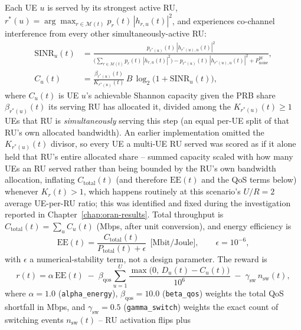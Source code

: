 Each UE $u$ is served by its strongest active RU,
$r^*(u) = \arg\max_{r \in \mathcal{M}(t)} p_r(t)\,|h_{r,u}(t)|^2$, and
experiences co-channel interference from every other simultaneously-active
RU:
\begin{align}
  \mathrm{SINR}_u(t) &= \frac{p_{r^*(u)}(t)\,|h_{r^*(u),u}(t)|^2}{\Big(\sum_{r \in \mathcal{M}(t)} p_r(t)\,|h_{r,u}(t)|^2\Big) - p_{r^*(u)}(t)\,|h_{r^*(u),u}(t)|^2 + P_{\mathrm{noise}}^{\mathrm{W}}}, \label{eq:oran-sinr}\\
  C_u(t) &= \frac{\beta_{r^*(u)}(t)}{K_{r^*(u)}(t)}\, B\, \log_2\!\big(1 + \mathrm{SINR}_u(t)\big), \label{eq:oran-capacity}
\end{align}
where $C_u(t)$ is UE $u$'s achievable Shannon capacity given the PRB share
$\beta_{r^*(u)}(t)$ its serving RU has allocated it, divided among the
$K_{r^*(u)}(t) \geq 1$ UEs that RU is \emph{simultaneously} serving this
step (an equal per-UE split of that RU's own allocated bandwidth). An
earlier implementation omitted the $K_{r^*(u)}(t)$ divisor, so every UE a
multi-UE RU served was scored as if it alone held that RU's entire
allocated share -- summed capacity scaled with how many UEs an RU served
rather than being bounded by the RU's own bandwidth allocation, inflating
$C_{\mathrm{total}}(t)$ (and therefore $\mathrm{EE}(t)$ and the QoS terms
below) whenever $K_r(t) > 1$, which happens routinely at this scenario's
$U/R = 2$ average UE-per-RU ratio; this was identified and fixed during
the investigation reported in Chapter~\ref{chap:oran-results}. Total
throughput is $C_{\mathrm{total}}(t) = \sum_u C_u(t)$ (Mbps, after unit conversion), and
energy efficiency is
\begin{equation}
  \mathrm{EE}(t) = \frac{C_{\mathrm{total}}(t)}{P_{\mathrm{total}}(t) + \epsilon}\ \ \text{[Mbit/Joule]}, \qquad \epsilon = 10^{-6},
  \label{eq:oran-ee}
\end{equation}
with $\epsilon$ a numerical-stability term, not a design parameter. The
reward is
\begin{equation}
  r(t) = \alpha\, \mathrm{EE}(t) \;-\; \beta_{\mathrm{qos}} \sum_{u=1}^{U} \frac{\max\big(0,\, D_u(t) - C_u(t)\big)}{10^6} \;-\; \gamma_{\mathrm{sw}}\, n_{\mathrm{sw}}(t),
  \label{eq:oran-reward}
\end{equation}
where $\alpha = 1.0$ (\texttt{alpha\_energy}), $\beta_{\mathrm{qos}} = 10.0$
(\texttt{beta\_qos}) weights the total QoS shortfall in Mbps, and
$\gamma_{\mathrm{sw}} = 0.5$ (\texttt{gamma\_switch}) weights the exact
count of switching events $n_{\mathrm{sw}}(t)$ -- RU activation flips plus

